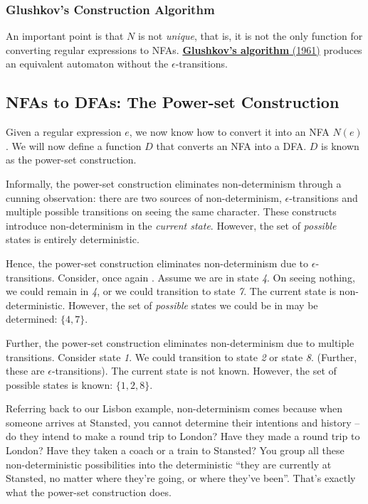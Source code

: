 \subsubsection{Glushkov's Construction Algorithm}
An important point is that $N$ is not \emph{unique}, that is, it is not the only function for converting regular expressions to NFAs. \href{https://en.wikipedia.org/wiki/Glushkov\%27s\_construction_algorithm}{\textbf{Glushkov's algorithm} (1961)} produces an equivalent automaton without the $\epsilon$-transitions.

\subsection{NFAs to DFAs: The Power-set Construction}
Given a regular expression $e$, we now know how to convert it into an NFA $N(e)$. We will now define a function $D$ that converts an NFA into a DFA. $D$ is known as the power-set construction. 

Informally, the power-set construction eliminates non-determinism through a cunning observation: there are two sources of non-determinism, $\epsilon$-transitions and multiple possible transitions on seeing the same character. These constructs introduce non-determinism in the \emph{current state}. However, the set of \emph{possible} states is entirely deterministic. 

Hence, the power-set construction eliminates non-determinism due to $\epsilon$-transitions. Consider, once again . Assume we are in state \textit{4}. On seeing nothing, we could remain in \textit{4}, or we could transition to state \textit{7}. The current state is non-deterministic. However, the set of \emph{possible} states we could be in may be determined: $\{ \textit{4}, \textit{7} \}$. 

Further, the power-set construction eliminates non-determinism due to multiple transitions. Consider state \textit{1}. We could transition to state \textit{2} or state \textit{8}. (Further, these are $\epsilon$-transitions). The current state is not known. However, the set of possible states is known: $\{ \textit{1}, \textit{2}, \textit{8} \}$.

Referring back to our Lisbon example, non-determinism comes because when someone arrives at Stansted, you cannot determine their intentions and history -- do they intend to make a round trip to London? Have they made a round trip to London? Have they taken a coach or a train to Stansted? You group all these non-deterministic possibilities into the deterministic ``they are currently at Stansted, no matter where they're going, or where they've been''. That's exactly what the power-set construction does.

